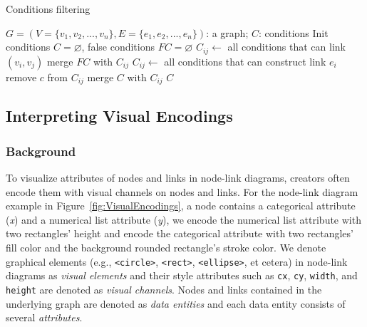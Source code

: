 \begin{algorithm}[!t]
    \renewcommand\arraystretch{1.2}
    \caption{ Conditions filtering }
    \label{alg:conditions}
    \begin{algorithmic}[1]
        \Require
            $G=(V=\{v_1, v_2, ..., v_n\}, E=\{e_1, e_2, ..., e_n\})$: a graph;
        \Ensure
            $C$: conditions
        \State Init conditions $C=\varnothing$, false conditions $FC=\varnothing$
                \State $C_{ij} \gets$ all conditions that can link $(v_i, v_j)$
                \State merge $FC$ with $C_{ij}$
            \EndIf
        \EndFor
            \State $C_{ij} \gets$ all conditions that can construct link $e_i$
                    \State remove $c$ from $C_{ij}$
                \EndIf
            \EndFor
            \State merge $C$ with $C_{ij}$
        \EndFor
        \State \Return $C$
    \end{algorithmic}
\end{algorithm}


\subsection{Interpreting Visual Encodings}\label{sec:visualencodings}
\subsubsection{Background}
To visualize attributes of nodes and links in node-link diagrams, creators often encode them with visual channels on nodes and links.
For the node-link diagram example in Figure~\ref{fig:VisualEncodings}, a node contains a categorical attribute (\textit{x}) and a numerical list attribute (\textit{y}), we encode the numerical list attribute with two rectangles' height and encode the categorical attribute with two rectangles' fill color and the background rounded rectangle's stroke color.
We denote graphical elements (e.g., \texttt{<circle>}, \texttt{<rect>}, \texttt{<ellipse>}, et cetera) in node-link diagrams as \textit{visual elements} and their style attributes such as \texttt{cx}, \texttt{cy}, \texttt{width}, and \texttt{height} are denoted as \textit{visual channels}.
Nodes and links contained in the underlying graph are denoted as \textit{data entities} and each data entity consists of several \textit{attributes}.

